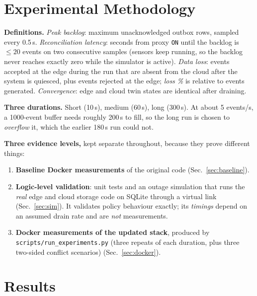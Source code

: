 \documentclass[11pt,a4paper]{article}
\begin{document}
\section{Experimental Methodology}\label{sec:method}
\textbf{Definitions.} \emph{Peak backlog}: maximum unacknowledged outbox rows, sampled every 0.5\,s.
\emph{Reconciliation latency}: seconds from proxy \texttt{ON} until the backlog is $\le 20$ events on two
consecutive samples (sensors keep running, so the backlog never reaches exactly zero while the
simulator is active). \emph{Data loss}: events accepted at the edge during the run that are absent from the
cloud after the system is quiesced, plus events rejected at the edge; \emph{loss \%} is relative to events
generated. \emph{Convergence}: edge and cloud twin states are identical after draining.

\textbf{Three durations.} Short (10\,s), medium (60\,s), long (300\,s). At about 5 events/s, a 1000-event
buffer needs roughly 200\,s to fill, so the long run is chosen to \emph{overflow} it, which the
earlier 180\,s run could not.

\textbf{Three evidence levels,} kept separate throughout, because they prove different things:
\begin{enumerate}[nosep]
\item \textbf{Baseline Docker measurements} of the original code (Sec.~\ref{sec:baseline}).
\item \textbf{Logic-level validation}: unit tests and an outage simulation that runs the \emph{real}
edge and cloud storage code on SQLite through a virtual link (Sec.~\ref{sec:sim}). It validates policy
behaviour exactly; its \emph{timings} depend on an assumed drain rate and are \emph{not} measurements.
\item \textbf{Docker measurements of the updated stack}, produced by \texttt{scripts/run\_experiments.py}
(three repeats of each duration, plus three two-sided conflict scenarios) (Sec.~\ref{sec:docker}).
\end{enumerate}

\section{Results}\label{sec:results}
\end{document}
